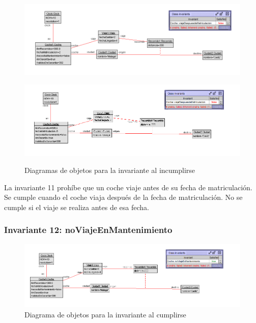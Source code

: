 \documentclass[12pt.a4paper]{article}
\begin{document}
    
 \begin{figure}[H]
    \centering
    \begin{minipage}{0.49\textwidth}
        \centering
        \includegraphics[width=1\linewidth]{Soils/11_v2.png}
        \label{fig:diagrama1}
    \end{minipage}
    \hfill
    \begin{minipage}{0.49\textwidth}
        \centering
        \includegraphics[width=1\linewidth]{Soils/11_v3.png}
        \label{fig:diagrama2}
    \end{minipage}
    \caption{Diagramas de objetos para la invariante al incumplirse}
    \label{fig:diagrama_invariante}
\end{figure}

La invariante 11 prohíbe que un coche viaje antes de su fecha de matriculación. Se cumple cuando el coche viaja después de la fecha de matriculación. No se cumple si el viaje se realiza antes de esa fecha.

\subsubsection{Invariante 12: noViajeEnMantenimiento}

\vspace{1.0 cm}
\begin{figure}[H]
     \includegraphics[width=1\linewidth]{Soils/12.png}
     \caption{Diagrama de objetos para la invariante al cumplirse}
     \label{Diagrama del sistema de aviacion}
\end{figure}
\end{document}
